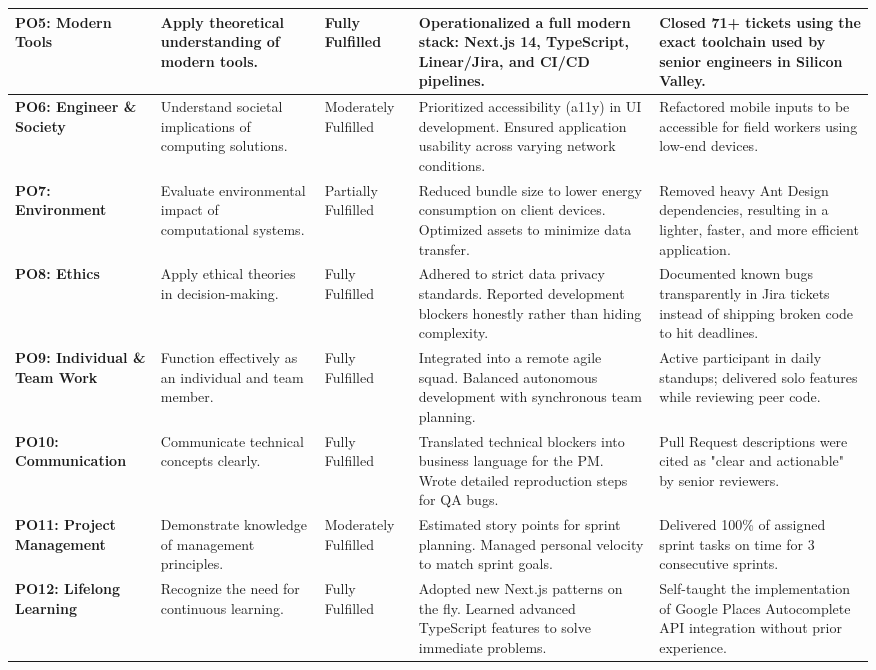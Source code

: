 \begin{longtable}[H]{|p{2.2cm}|p{3.0cm}|p{1.8cm}|p{3.5cm}|p{3.5cm}|}
\textbf{PO5: Modern Tools} & Apply theoretical understanding of modern tools. & Fully Fulfilled & Operationalized a full modern stack: Next.js 14, TypeScript, Linear/Jira, and CI/CD pipelines. & Closed 71+ tickets using the exact toolchain used by senior engineers in Silicon Valley. \\
\hline

\textbf{PO6: Engineer \& Society} & Understand societal implications of computing solutions. & Moderately Fulfilled & Prioritized accessibility (a11y) in UI development. Ensured application usability across varying network conditions. & Refactored mobile inputs to be accessible for field workers using low-end devices. \\
\hline

\textbf{PO7: Environment} & Evaluate environmental impact of computational systems. & Partially Fulfilled & Reduced bundle size to lower energy consumption on client devices. Optimized assets to minimize data transfer. & Removed heavy Ant Design dependencies, resulting in a lighter, faster, and more efficient application. \\
\hline

\textbf{PO8: Ethics} & Apply ethical theories in decision-making. & Fully Fulfilled & Adhered to strict data privacy standards. Reported development blockers honestly rather than hiding complexity. & Documented known bugs transparently in Jira tickets instead of shipping broken code to hit deadlines. \\
\hline

\textbf{PO9: Individual \& Team Work} & Function effectively as an individual and team member. & Fully Fulfilled & Integrated into a remote agile squad. Balanced autonomous development with synchronous team planning. & Active participant in daily standups; delivered solo features while reviewing peer code. \\
\hline

\textbf{PO10: Communication} & Communicate technical concepts clearly. & Fully Fulfilled & Translated technical blockers into business language for the PM. Wrote detailed reproduction steps for QA bugs. & Pull Request descriptions were cited as "clear and actionable" by senior reviewers. \\
\hline

\textbf{PO11: Project Management} & Demonstrate knowledge of management principles. & Moderately Fulfilled & Estimated story points for sprint planning. Managed personal velocity to match sprint goals. & Delivered 100\% of assigned sprint tasks on time for 3 consecutive sprints. \\
\hline

\textbf{PO12: Lifelong Learning} & Recognize the need for continuous learning. & Fully Fulfilled & Adopted new Next.js patterns on the fly. Learned advanced TypeScript features to solve immediate problems. & Self-taught the implementation of Google Places Autocomplete API integration without prior experience. \\
\end{longtable}
